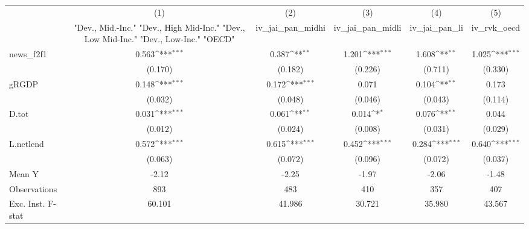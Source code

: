 {
\def\sym#1{\ifmmode^{#1}\else\(^{#1}\)\fi}
\begin{tabular}{l*{5}{c}}
\toprule
            &\multicolumn{1}{c}{(1)}&\multicolumn{1}{c}{(2)}&\multicolumn{1}{c}{(3)}&\multicolumn{1}{c}{(4)}&\multicolumn{1}{c}{(5)}\\
            &\multicolumn{1}{c}{ "Dev., Mid.-Inc." "Dev., High Mid-Inc." "Dev., Low Mid-Inc." "Dev., Low-Inc." "OECD" }&\multicolumn{1}{c}{iv\_jai\_pan\_midhi}&\multicolumn{1}{c}{iv\_jai\_pan\_midli}&\multicolumn{1}{c}{iv\_jai\_pan\_li}&\multicolumn{1}{c}{iv\_rvk\_oecd}\\
\midrule
news\_f2f1   &       0.563\sym{***}&       0.387\sym{**} &       1.201\sym{***}&       1.608\sym{**} &       1.025\sym{***}\\
            &     (0.170)         &     (0.182)         &     (0.226)         &     (0.711)         &     (0.330)         \\
\addlinespace
gRGDP       &       0.148\sym{***}&       0.172\sym{***}&       0.071         &       0.104\sym{**} &       0.173         \\
            &     (0.032)         &     (0.048)         &     (0.046)         &     (0.043)         &     (0.114)         \\
\addlinespace
D.tot       &       0.031\sym{***}&       0.061\sym{**} &       0.014\sym{*}  &       0.076\sym{**} &       0.044         \\
            &     (0.012)         &     (0.024)         &     (0.008)         &     (0.031)         &     (0.029)         \\
\addlinespace
L.netlend   &       0.572\sym{***}&       0.615\sym{***}&       0.452\sym{***}&       0.284\sym{***}&       0.640\sym{***}\\
            &     (0.063)         &     (0.072)         &     (0.096)         &     (0.072)         &     (0.037)         \\
\midrule
Mean Y      &       -2.12         &       -2.25         &       -1.97         &       -2.06         &       -1.48         \\
Observations&         893         &         483         &         410         &         357         &         407         \\
Exc. Inst. F-stat&      60.101         &      41.986         &      30.721         &      35.980         &      43.567         \\
\bottomrule
\end{tabular}
}
